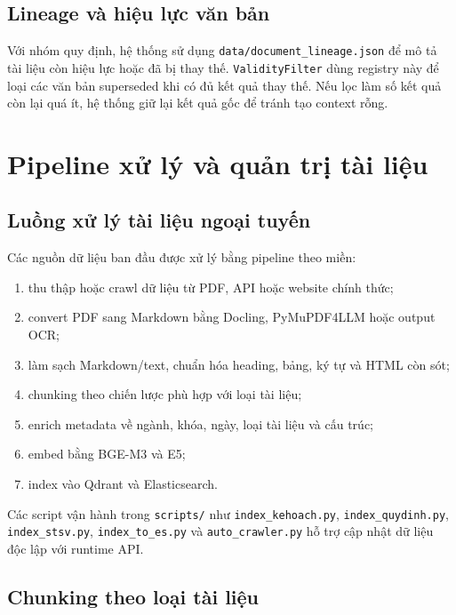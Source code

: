 \documentclass[../DoAn.tex]{subfiles}
\begin{document}
\subsection{Lineage và hiệu lực văn bản}

Với nhóm quy định, hệ thống sử dụng \texttt{data/document\_lineage.json} để mô
tả tài liệu còn hiệu lực hoặc đã bị thay thế. \texttt{ValidityFilter} dùng registry
này để loại các văn bản superseded khi có đủ kết quả thay thế. Nếu lọc làm số
kết quả còn lại quá ít, hệ thống giữ lại kết quả gốc để tránh tạo context rỗng.

\section{Pipeline xử lý và quản trị tài liệu}

\subsection{Luồng xử lý tài liệu ngoại tuyến}

Các nguồn dữ liệu ban đầu được xử lý bằng pipeline theo miền:

\begin{enumerate}
    \item thu thập hoặc crawl dữ liệu từ PDF, API hoặc website chính thức;
    \item convert PDF sang Markdown bằng Docling, PyMuPDF4LLM hoặc output OCR;
    \item làm sạch Markdown/text, chuẩn hóa heading, bảng, ký tự và HTML còn sót;
    \item chunking theo chiến lược phù hợp với loại tài liệu;
    \item enrich metadata về ngành, khóa, ngày, loại tài liệu và cấu trúc;
    \item embed bằng BGE-M3 và E5;
    \item index vào Qdrant và Elasticsearch.
\end{enumerate}

Các script vận hành trong \texttt{scripts/} như \texttt{index\_kehoach.py},
\texttt{index\_quydinh.py}, \texttt{index\_stsv.py}, \texttt{index\_to\_es.py}
và \texttt{auto\_crawler.py} hỗ trợ cập nhật dữ liệu độc lập với runtime API.

\subsection{Chunking theo loại tài liệu}
\end{document}
